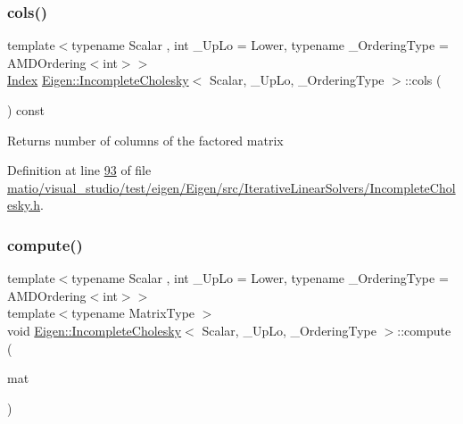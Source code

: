 \mbox{\label{class_eigen_1_1_incomplete_cholesky_a0d66a1c8e340617e7ff404e63186fedb}} 
\subsubsection{\texorpdfstring{cols()}{cols()}\hspace{0.1cm}{\footnotesize\ttfamily [2/2]}}
{\footnotesize\ttfamily template$<$typename Scalar , int \+\_\+\+Up\+Lo = Lower, typename \+\_\+\+Ordering\+Type  = A\+M\+D\+Ordering$<$int$>$$>$ \\
\hyperlink{namespace_eigen_a62e77e0933482dafde8fe197d9a2cfde}{Index} \hyperlink{class_eigen_1_1_incomplete_cholesky}{Eigen\+::\+Incomplete\+Cholesky}$<$ Scalar, \+\_\+\+Up\+Lo, \+\_\+\+Ordering\+Type $>$\+::cols (\begin{DoxyParamCaption}\item[{void}]{ }\end{DoxyParamCaption}) const\hspace{0.3cm}{\ttfamily [inline]}}

\begin{DoxyReturn}{Returns}
number of columns of the factored matrix 
\end{DoxyReturn}


Definition at line \hyperlink{matio_2visual__studio_2test_2eigen_2_eigen_2src_2_iterative_linear_solvers_2_incomplete_cholesky_8h_source_l00093}{93} of file \hyperlink{matio_2visual__studio_2test_2eigen_2_eigen_2src_2_iterative_linear_solvers_2_incomplete_cholesky_8h_source}{matio/visual\+\_\+studio/test/eigen/\+Eigen/src/\+Iterative\+Linear\+Solvers/\+Incomplete\+Cholesky.\+h}.

\mbox{\label{class_eigen_1_1_incomplete_cholesky_a7966bedeebbeaa7a8fe4dd1da3797a0b}} 
\subsubsection{\texorpdfstring{compute()}{compute()}\hspace{0.1cm}{\footnotesize\ttfamily [1/2]}}
{\footnotesize\ttfamily template$<$typename Scalar , int \+\_\+\+Up\+Lo = Lower, typename \+\_\+\+Ordering\+Type  = A\+M\+D\+Ordering$<$int$>$$>$ \\
template$<$typename Matrix\+Type $>$ \\
void \hyperlink{class_eigen_1_1_incomplete_cholesky}{Eigen\+::\+Incomplete\+Cholesky}$<$ Scalar, \+\_\+\+Up\+Lo, \+\_\+\+Ordering\+Type $>$\+::compute (\begin{DoxyParamCaption}\item[{const Matrix\+Type \&}]{mat }\end{DoxyParamCaption})\hspace{0.3cm}{\ttfamily [inline]}}


